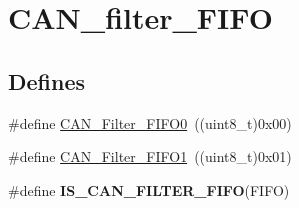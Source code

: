 \hypertarget{group__CAN__filter__FIFO}{
\section{CAN\_\-filter\_\-FIFO}
\label{group__CAN__filter__FIFO}
}
\subsection*{Defines}
\begin{DoxyCompactItemize}
\item 
\#define \hyperlink{group__CAN__filter__FIFO_ga8249c27978ca94676530540b88a6be8f}{CAN\_\-Filter\_\-FIFO0}~((uint8\_\-t)0x00)
\item 
\#define \hyperlink{group__CAN__filter__FIFO_gaab8478c89a607c4b8baf68efc730e316}{CAN\_\-Filter\_\-FIFO1}~((uint8\_\-t)0x01)
\item 
\#define {\bfseries IS\_\-CAN\_\-FILTER\_\-FIFO}(FIFO)
\end{DoxyCompactItemize}


